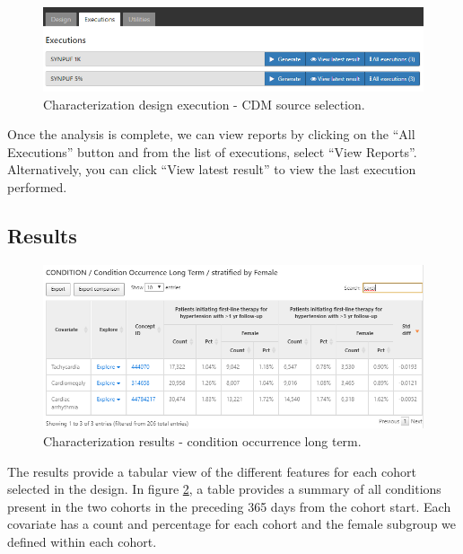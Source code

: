 \documentclass[11pt]{book}
\theoremstyle{definition}
\theoremstyle{definition}
\theoremstyle{definition}
\theoremstyle{remark}
\begin{document}
\begin{figure}

{\centering \includegraphics[width=1\linewidth]{images/Characterization/atlasCharacterizationExecutions} 

}

\caption{Characterization design execution - CDM source selection.}\label{fig:atlasCharacterizationExecutions}
\end{figure}

Once the analysis is complete, we can view reports by clicking on the ``All Executions'' button and from the list of executions, select ``View Reports''. Alternatively, you can click ``View latest result'' to view the last execution performed.

\hypertarget{results}{%
\subsection{Results}\label{results}}

\begin{figure}

{\centering \includegraphics[width=1\linewidth]{images/Characterization/atlasCharacterizationResultsSummary} 

}

\caption{Characterization results - condition occurrence long term.}\label{fig:atlasCharacterizationResultsSummary}
\end{figure}

The results provide a tabular view of the different features for each cohort selected in the design. In figure \ref{fig:atlasCharacterizationResultsSummary}, a table provides a summary of all conditions present in the two cohorts in the preceding 365 days from the cohort start. Each covariate has a count and percentage for each cohort and the female subgroup we defined within each cohort.
\end{document}
